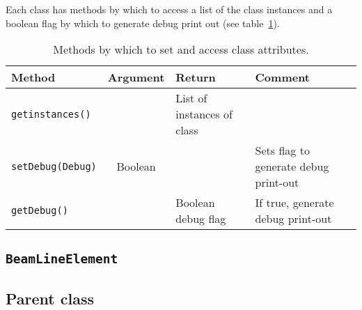 Each class has methods by which to access a list of the class
instances and a boolean flag by which to generate debug print out (see
table~\ref{Tab:ClassAttributeAccess}).
\begin{table}
  \caption{Methods by which to set and access class attributes.}
  \label{Tab:ClassAttributeAccess}
  \begin{center}
    \begin{tabular}{|l|c|l|l|}
      \hline
      \textbf{Method}          & \textbf{Argument} & \textbf{Return}            & \textbf{Comment}                      \\
      \hline
      \texttt{getinstances()}  &                   & List of instances of class &                                       \\
      \texttt{setDebug(Debug)} & Boolean           &                            & Sets flag to generate debug print-out \\
      \texttt{getDebug()}      &                   & Boolean debug flag         & If true, generate debug print-out     \\
      \hline
    \end{tabular}
  \end{center}
\end{table}

\subsection{\texttt{BeamLineElement}}

\subsection{Parent class}

